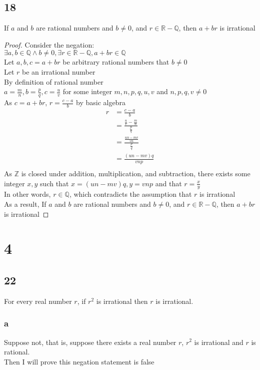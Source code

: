 \documentclass{article}
\begin{document}
\subsection{18}
If $a$ and $b$ are rational numbers and $b \neq 0$, and $r \in \mathbb{R} - \mathbb{Q}$, then $a + br$ is irrational \\
\begin{proof}
Consider the negation:\\
$\exists a, b \in \mathbb{Q} \wedge b \neq 0, \exists r \in \mathbb{R} - \mathbb{Q}, a + br \in \mathbb{Q}$\\
Let $a, b, c = a + br$ be arbitrary rational numbers that $b \neq 0$\\
Let $r$ be an irrational number\\
By definition of rational number\\
$a = \frac{m}{n}, b = \frac{p}{q}, c = \frac{u}{v}$ for some integer $m,n,p,q,u,v$ and $n,p,q,v \neq 0$\\
As $c = a + br$, $r = \frac{c-a}{b}$ by basic algebra\\
\begin{align*}
    r &= \frac{c-a}{b}\\
    &= \frac{\frac{u}{v} - \frac{m}{n}}{\frac{p}{q}} \tag{By substitution}\\
    &= \frac{\frac{un-mv}{vn}}{\frac{p}{q}}\\
    &= \frac{(un-mv)q}{vnp}\tag{By algebra}\\
\end{align*}
As $\mathbb{Z}$ is closed under addition, multiplication, and subtraction, there exists some integer $x,y$ such that $x = (un-mv)q, y = vnp$ and that $r = \frac{x}{y}$\\
In other words, $r \in \mathbb{Q}$, which contradicts the assumption that $r$ is irrational\\
As a result, If $a$ and $b$ are rational numbers and $b \neq 0$, and $r \in \mathbb{R} - \mathbb{Q}$, then $a + br$ is irrational
\end{proof}


\section{4}
\subsection{22}
For every real number $r$, if $r^2$ is irrational then $r$ is irrational.
\subsubsection{a}
Suppose not, that is, suppose there exists a real number $r$, $r^2$ is irrational and $r$ is rational.\\
Then I will prove this negation statement is false
\end{document}

